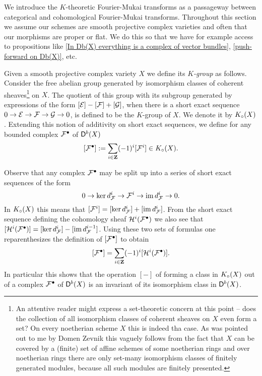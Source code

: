 We introduce the $K$-theoretic Fourier-Mukai transforms as a passageway between categorical and cohomological Fourier-Mukai transforms. Throughout this section we assume our schemes are smooth projective complex varieties and often that our morphisms are proper or flat. We do this so that we have for example access to propositions like \ref{In Db(X) everything is a complex of vector bundles}, \ref{push-forward on Db(X)}, etc.

Given a smooth projective complex variety $X$ we define its \emph{$K$-group} as follows. Consider the free abelian group generated by isomorphism classes of coherent sheaves\footnote{
    An attentive reader might express a set-theoretic concern at this point -- does the collection of all isomorphism classes of coherent sheaves on $X$ even form a set? On every noetherian scheme $X$ this is indeed tha case. As was pointed out to me by Domen Zevnik this vaguely follows from the fact that $X$ can be covered by a (finite) set of affine schemes of some noetherian rings and over noetherian rings there are only set-many isomorphism classes of finitely generated modules, because all such modules are finitely presented. 
} on $X$. The quotient of this group with its subgroup generated by expressions of the form $[\mathcal E] - [\mathcal F] + [\mathcal G]$, when there is a short exact sequence $0 \to \mathcal E \to \mathcal F \to \mathcal G \to 0$, is defined to be the $K$-group of $X$. We denote it by $K_{\circ}(X)$. Extending this notion of additivity on short exact sequences, we define for any bounded complex $\mathcal F^\bullet$ of $\mathsf{D}^b(X)$ 
\[
    [\mathcal F^\bullet] := \sum_{i \in \mathbf Z}(-1)^i[\mathcal F^i] \in K_{\circ}(X).
\]
\begin{remark}
    Observe that any complex $\mathcal F^\bullet$ may be split up into a series of short exact sequences of the form
    \[
        0 \to \ker d^{i}_\mathcal F \to \mathcal F^i \to \operatorname{im} d^i_\mathcal F \to 0.
    \]
    In $K_{\circ}(X)$ this means that $[\mathcal F^i] = [\ker d^{i}_\mathcal F] + [\operatorname{im} d^i_\mathcal F]$. From the short exact sequence defining the cohomology sheaf  $\mathcal H^i(\mathcal F^\bullet)$ we also see that $[\mathcal H^i(\mathcal F^\bullet)] = [\ker d^{i}_\mathcal F] - [\operatorname{im} d^{i-1}_\mathcal F]$. Using these two sets of formulas one reparenthesizes the definition of $[\mathcal F^\bullet]$ to obtain
    \begin{equation}
        \label{eq: K-class alternating sum of cohomology}
        [\mathcal F^\bullet] = \sum_{i \in \mathbf Z}(-1)^i[\mathcal H^i(\mathcal F^\bullet)].
    \end{equation}
    In particular this shows that the operation $[-]$ of forming a class in $K_{\circ}(X)$ out of a complex $\mathcal F^\bullet$ of $\mathsf{D}^b(X)$ is an invariant of its isomorphism class in $\mathsf{D}^b(X)$.
\end{remark}


